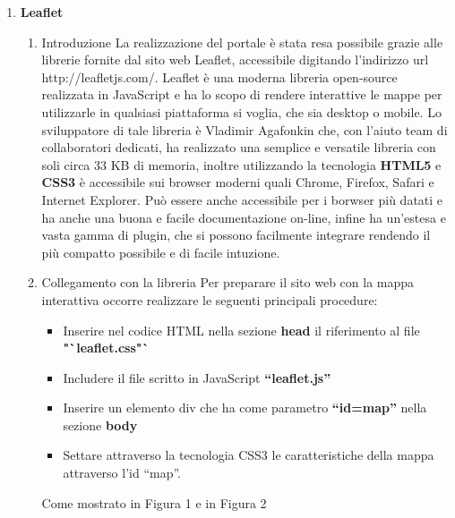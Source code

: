 \documentclass[a4paper,11pt]{article}
\newcommand{\tab}[1]{\hspace{.3\textwidth}\rlap{#1}}
\begin{document}
\begin{enumerate}
	\item \LARGE{\textbf{Leaflet}}
		\begin{enumerate}
			\Large
			\item {Introduzione}\newline
La realizzazione del portale è stata resa possibile grazie alle librerie fornite dal sito web Leaflet, accessibile digitando l'indirizzo url http://leafletjs.com/.
			Leaflet è una moderna libreria open-source realizzata in JavaScript e ha lo scopo di rendere interattive le mappe per utilizzarle in qualsiasi piattaforma si voglia, che sia desktop o mobile. Lo sviluppatore di tale libreria è Vladimir Agafonkin che, con l'aiuto team di collaboratori dedicati, ha realizzato una semplice e versatile libreria con soli circa 33 KB di memoria, inoltre utilizzando la tecnologia \textbf{HTML5} e \textbf{CSS3} è accessibile sui browser moderni quali Chrome, Firefox, Safari e Internet Explorer. Può essere anche accessibile per i borwser più datati e ha anche una buona e facile documentazione on-line, infine ha un'estesa e vasta gamma di plugin, che si possono facilmente integrare rendendo il più compatto possibile e di facile intuzione.	
			\medskip
			\item Collegamento con la libreria\newline
Per preparare il sito web con la mappa interattiva occorre realizzare le seguenti principali procedure:
			\begin{itemize}
				\item Inserire nel codice HTML nella sezione \textbf{head} il riferimento al file \textbf{"`leaflet.css"`}
				\item Includere il file scritto in JavaScript \textbf{"`leaflet.js"'}
				\item Inserire un elemento div che ha come parametro \textbf{"`id=map"'} nella sezione \textbf{body}
				\item Settare attraverso la tecnologia CSS3 le caratteristiche della mappa attraverso l'id "`map"'.				
			\end{itemize}
Come mostrato in Figura 1 e in Figura 2

			\begin{figure}[!ht]
			\end{figure}
			\tab {\textbf{Figura 1}}
			\newpage
			\begin{figure}[!ht]
			\end{figure}
			\tab{\textbf{Figura 2}}
				\newline				
			\medskip
			

\end{enumerate}
\end{enumerate}
\end{document}
